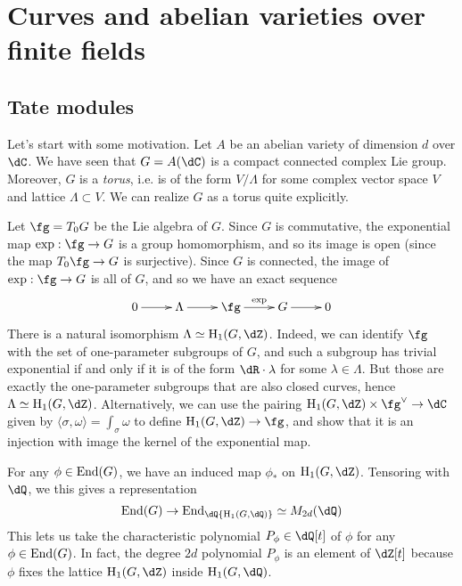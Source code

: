 




\section{Curves and abelian varieties over finite fields}


\subsection{Tate modules}

Let's start with some motivation. Let $A$ be an abelian variety of dimension 
$d$ over $\dC$. We have seen that $G=A(\dC)$ is a compact connected complex Lie 
group. Moreover, $G$ is a \emph{torus}, i.e. is of the form $V/\Lambda$ for 
some complex vector space $V$ and lattice $\Lambda\subset V$. We can realize 
$G$ as a torus quite explicitly. 

Let $\fg=T_0 G$ be the Lie algebra of $G$. Since $G$ is commutative, the 
exponential map $\exp:\fg\to G$ is a group homomorphism, and so its image is 
open (since the map $T_0 \fg\to G$ is surjective). Since $G$ is connected, 
the image of $\exp:\fg\to G$ is all of $G$, and so we have an exact sequence 
\[\xymatrix{
  0 \ar[r] 
    & \Lambda \ar[r] 
    & \fg \ar[r]^-{\exp} 
    & G \ar[r] 
    & 0
}\]
There is a natural isomorphism $\Lambda\simeq \h_1(G,\dZ)$. Indeed, we can 
identify $\fg$ with the set of one-parameter subgroups of $G$, and such a 
subgroup has trivial exponential if and only if it is of the form 
$\dR\cdot \lambda$ for some $\lambda\in\Lambda$. But those are exactly the 
one-parameter subgroups that are also closed curves, hence 
$\Lambda\simeq \h_1(G,\dZ)$. Alternatively, we can use the pairing 
$\h_1(G,\dZ)\times \fg^\vee\to \dC$ given by 
$\langle \sigma,\omega\rangle=\int_\sigma\omega$ to define 
$\h_1(G,\dZ)\to \fg$, and show that it is an injection with image the kernel 
of the exponential map. 

For any $\phi\in \operatorname{End}(G)$, we have an induced map $\phi_\ast$ on 
$\h_1(G,\dZ)$. Tensoring with $\dQ$, we this gives a representation 
\[
  \End(G) \to \End_\dQ{\h_1(G,\dQ)} \simeq M_{2 d}(\dQ)
\]
This lets us take the characteristic polynomial $P_\phi\in \dQ[t]$ of $\phi$ 
for any $\phi\in \operatorname{End}(G)$. In fact, the degree $2 d$ polynomial 
$P_\phi$ is an element of $\dZ[t]$ because $\phi$ fixes the lattice 
$\h_1(G,\dZ)$ inside $\h_1(G,\dQ)$. 


